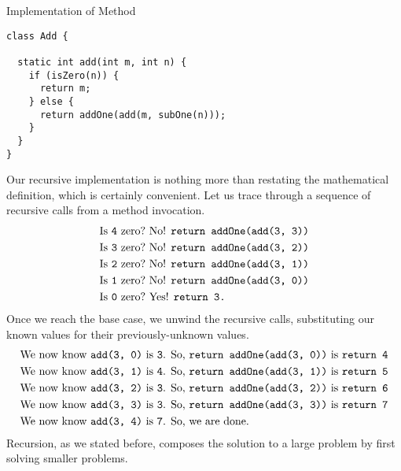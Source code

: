 \begin{cl}[]{Implementation of  Method}
\begin{lstlisting}[language=MyJava]
class Add {

  static int add(int m, int n) {
    if (isZero(n)) { 
      return m;
    } else {
      return addOne(add(m, subOne(n)));
    }
  }
}
\end{lstlisting}
\end{cl}
Our recursive implementation is nothing more than restating the mathematical definition, which is certainly convenient. Let us trace through a sequence of recursive calls from a method invocation.
\begin{align*}
    \text{Is }\texttt{4} \text{ zero?} &\text{ No! }\texttt{return addOne(add(3, 3))}\\
    \text{Is }\texttt{3} \text{ zero?} &\text{ No! }\texttt{return addOne(add(3, 2))}\\
    \text{Is }\texttt{2} \text{ zero?} &\text{ No! }\texttt{return addOne(add(3, 1))}\\
    \text{Is }\texttt{1} \text{ zero?} &\text{ No! }\texttt{return addOne(add(3, 0))}\\
    \text{Is }\texttt{0} \text{ zero?} &\text{ Yes! }\texttt{return 3.}
\end{align*}
Once we reach the base case, we unwind the recursive calls, substituting our known values for their previously-unknown values.
\begin{align*}
    \text{We now know }\texttt{add(3, 0)} \text{ is }\texttt{3}\text{. So, } &\texttt{return addOne(add(3, 0))} \text{ is } \texttt{return 4}\\
    \text{We now know }\texttt{add(3, 1)} \text{ is }\texttt{4}\text{. So, } &\texttt{return addOne(add(3, 1))} \text{ is } \texttt{return 5}\\
    \text{We now know }\texttt{add(3, 2)} \text{ is }\texttt{3}\text{. So, } &\texttt{return addOne(add(3, 2))} \text{ is } \texttt{return 6}\\
    \text{We now know }\texttt{add(3, 3)} \text{ is }\texttt{3}\text{. So, } &\texttt{return addOne(add(3, 3))} \text{ is } \texttt{return 7}\\
    \text{We now know }\texttt{add(3, 4)} \text{ is }\texttt{7}\text{. So, } &\text{we are done.} 
\end{align*}
Recursion, as we stated before, composes the solution to a large problem by first solving smaller problems.

